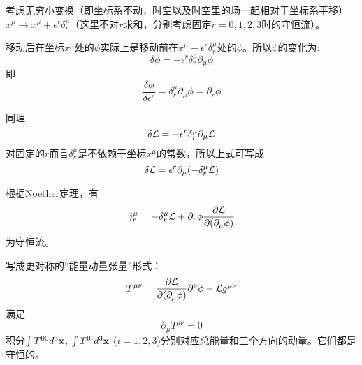\documentclass[CJK]{beamer}
\begin{document}
\begin{frame}
\bch
考虑无穷小变换（即坐标系不动，时空以及时空里的场一起相对于坐标系平移）$x^\mu \rightarrow x^\mu + \epsilon^r \delta_r^\mu$（这里不对$r$求和，分别考虑固定$r=0,1,2,3$时的守恒流）。

移动后在坐标$x^\mu$处的$\phi$实际上是移动前在$x^\mu - \epsilon^r \delta_r^\mu$处的$\phi$。所以$\phi$的变化为:
$$\delta\phi = - \epsilon^r \delta_r^\mu \partial_\mu\phi$$
即
$$\frac{\delta\phi}{\delta\epsilon^r} = \delta_r^\mu \partial_\mu \phi = \partial_r\phi$$

\skipline

同理
$$\delta{\mathcal{L}} = - \epsilon^r \delta_r^\mu \partial_\mu{\mathcal{L}}$$
对固定的$r$而言$ \delta_r^\mu$是不依赖于坐标$x^\mu$的常数，所以上式可写成
$$\delta{\mathcal{L}} =\epsilon^r \partial_\mu (-  \delta_r^\mu {\mathcal{L}})$$

\ech
\end{frame}

\begin{frame}
\bch
根据Noether定理，有
$$j^\mu_r = - \delta_r^\mu {\mathcal{L}} +  \partial_r \phi\frac{\partial {\mathcal{L}}}{\partial (\partial_\mu \phi)}$$
为守恒流。

写成更对称的“能量动量张量”形式：
$$T^{\mu\nu} = \frac{\partial {\mathcal{L}}}{\partial (\partial_\mu \phi)}\partial^\nu\phi- {\mathcal{L}} g^{\mu\nu}$$
满足
$$\partial_\mu T^{\mu\nu} = 0$$
积分$\int T^{00} d^3{\mathbf{x}}$, $\int T^{0i}d^3{\mathbf{x}}$ ($i=1,2,3$)分别对应总能量和三个方向的动量。它们都是守恒的。
\ech
\end{frame}
\end{document}
